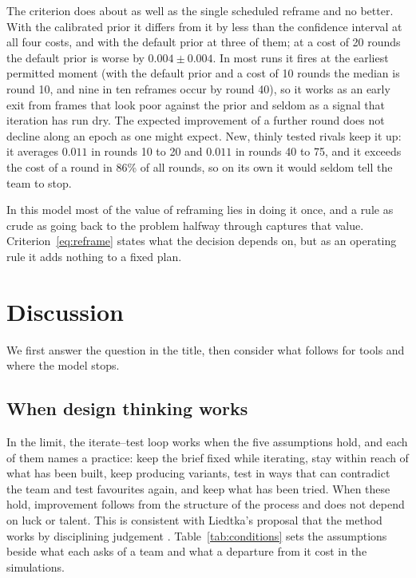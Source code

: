 \documentclass[10pt,twocolumn]{article}
\theoremstyle{definition}
\begin{document}
The criterion does about as well as the single scheduled reframe and no better. With the calibrated prior it differs from it by less than the confidence interval at all four costs, and with the default prior at three of them; at a cost of 20 rounds the default prior is worse by $0.004\pm0.004$. In most runs it fires at the earliest permitted moment (with the default prior and a cost of 10 rounds the median is round 10, and nine in ten reframes occur by round 40), so it works as an early exit from frames that look poor against the prior and seldom as a signal that iteration has run dry. The expected improvement of a further round does not decline along an epoch as one might expect. New, thinly tested rivals keep it up: it averages $0.011$ in rounds 10 to 20 and $0.011$ in rounds 40 to 75, and it exceeds the cost of a round in 86\% of all rounds, so on its own it would seldom tell the team to stop.

In this model most of the value of reframing lies in doing it once, and a rule as crude as going back to the problem halfway through captures that value. Criterion~\eqref{eq:reframe} states what the decision depends on, but as an operating rule it adds nothing to a fixed plan.

\section{Discussion}
\label{sec:discussion}

We first answer the question in the title, then consider what follows for tools and where the model stops.

\subsection{When design thinking works}

In the limit, the iterate--test loop works when the five assumptions hold, and each of them names a practice: keep the brief fixed while iterating, stay within reach of what has been built, keep producing variants, test in ways that can contradict the team and test favourites again, and keep what has been tried. When these hold, improvement follows from the structure of the process and does not depend on luck or talent. This is consistent with Liedtka's proposal that the method works by disciplining judgement \citep{liedtka2015}. Table~\ref{tab:conditions} sets the assumptions beside what each asks of a team and what a departure from it cost in the simulations.
\end{document}
